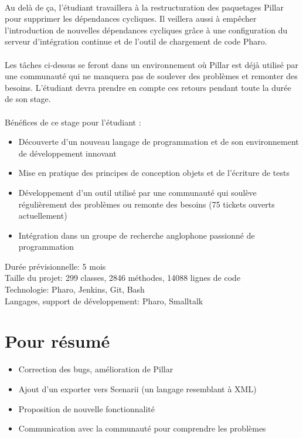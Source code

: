 \documentclass[french,twoside,openany,showtrims]{root/support/latex/sbabook/sbabook}
\begin{document}
      ~~\\

      Au delà de ça, l'étudiant travaillera à la restructuration des paquetages Pillar
      pour supprimer les dépendances cycliques. Il veillera aussi à empêcher l'introduction
      de nouvelles dépendances cycliques grâce à une configuration du serveur d'intégration
      continue et de l'outil de chargement de code Pharo.\\

      ~~\\

      Les tâches ci-dessus se feront dans un environnement où Pillar est déjà utilisé
      par une communauté qui ne manquera pas de soulever des problèmes et remonter
      des besoins. L'étudiant devra prendre en compte ces retours pendant toute
      la durée de son stage.\\

      ~~\\

      Bénéfices de ce stage pour l'étudiant :\\

      \begin{itemize}
        \item Découverte d'un nouveau langage de programmation et de son environnement de développement innovant
        \item Mise en pratique des principes de conception objets et de l'écriture de tests
        \item Développement d'un outil utilisé par une communauté qui soulève régulièrement
        des problèmes ou remonte des besoins (75 tickets ouverts actuellement)
        \item Intégration dans un groupe de recherche anglophone passionné de programmation
      \end{itemize}

      Durée prévisionnelle: 5 mois\\
      Taille du projet: 299 classes, 2846 méthodes, 14088 lignes de code\\
      Technologie: Pharo, Jenkins, Git, Bash\\
      Langages, support de développement: Pharo, Smalltalk

      \section{Pour résumé}
      \begin{itemize}
        \item Correction des bugs, amélioration de Pillar
        \item Ajout d'un exporter vers Scenarii (un langage resemblant à XML)
        \item Proposition de nouvelle fonctionnalité
        \item Communication avec la communauté pour comprendre les problèmes
      \end{itemize}

\clearpage
\end{document}
